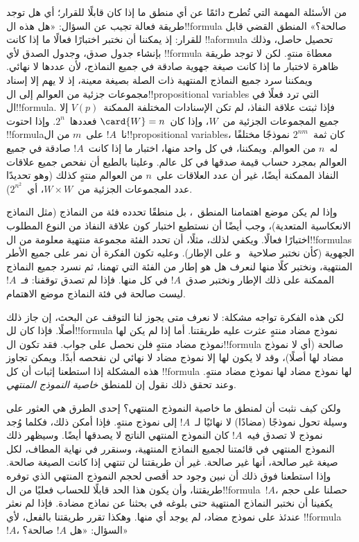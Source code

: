 \documentclass[../../../include/open-logic-section]{subfiles}
\begin{document}


من الأسئلة المهمة التي تُطرح دائمًا عن أي منطق ما إذا كان قابلًا للقرار؛
أي هل توجد طريقة فعالة تجيب عن السؤال: «هل هذه ال!!{formula} صالحة؟»
المنطق القضي قابل للقرار: إذ يمكننا أن نختبر اختبارًا فعالًا ما إذا كانت
!!a{formula} تحصيل حاصل، وذلك بإنشاء جدول صدق، وجدول الصدق لأي
!!{formula} معطاة منتهٍ. لكن لا توجد طريقة ظاهرة لاختبار ما إذا كانت صيغة
جهوية صادقة في جميع النماذج، لأن عددها لا نهائي. ويمكننا سرد جميع النماذج
المنتهية ذات الصلة بصيغة معينة، إذ لا يهم إلا إسناد مجموعات جزئية من العوالم
إلى ال!!{propositional variable}s التي ترد فعلًا في ال!!{formula}. فإذا
ثبتت علاقة النفاذ، لم تكن الإسنادات المختلفة الممكنة~$V(p)$ إلا جميع
المجموعات الجزئية من~$W$، وإذا كان~$\card{W}=n$ فعددها~$2^n$. وإذا
احتوت !!{formula}نا~$!A$ على~$m$ من ال!!{propositional
  variable}s،
كان ثمة~$2^{nm}$ نموذجًا مختلفًا له~$n$ من العوالم. ويمكننا، في كل واحد
منها، اختبار ما إذا كانت~$!A$ صادقة في جميع العوالم بمجرد حساب قيمة صدقها
في كل عالم. وعلينا بالطبع أن نفحص جميع علاقات النفاذ الممكنة أيضًا، غير أن
عدد العلاقات على~$n$ من العوالم منتهٍ كذلك (وهو تحديدًا عدد المجموعات
الجزئية من~$W \times W$، أي~$2^{n^2}$).

وإذا لم يكن موضع اهتمامنا المنطق~، بل منطقًا تحدده فئة من النماذج
(مثل النماذج الانعكاسية المتعدية)، وجب أيضًا أن نستطيع اختبار كون علاقة
النفاذ من النوع المطلوب اختبارًا فعالًا. ويكفي لذلك، مثلًا، أن تحدد الفئة
مجموعة منتهية معلومة من ال!!{formula}s الجهوية (كأن نختبر صلاحية~
و على الإطار).
وعليه تكون الفكرة أن نمر على جميع الأطر المنتهية، ونختبر كلًا منها لنعرف هل
هو إطار من الفئة التي تهمنا، ثم نسرد جميع النماذج الممكنة على ذلك الإطار
ونختبر صدق~$!A$ في كل منها. فإذا لم تصدق توقفنا: فـ~$!A$ ليست صالحة في
فئة النماذج موضع الاهتمام.

لكن هذه الفكرة تواجه مشكلة: لا نعرف متى يجوز لنا التوقف عن البحث، إن جاز
ذلك أصلًا. فإذا كان لل!!{formula} نموذج مضاد منتهٍ عثرت عليه طريقتنا. أما
إذا لم يكن لها نموذج مضاد منتهٍ فلن نحصل على جواب. فقد تكون ال!!{formula}
صالحة (أي لا نموذج مضاد لها أصلًا)، وقد لا يكون لها إلا نموذج مضاد لا نهائي
لن نفحصه أبدًا. ويمكن تجاوز هذه المشكلة إذا استطعنا إثبات أن كل !!{formula}
لها نموذج مضاد لها نموذج مضاد منتهٍ. وعند تحقق ذلك نقول إن للمنطق
\emph{خاصية النموذج المنتهي}.

ولكن كيف نثبت أن لمنطق ما خاصية النموذج المنتهي؟ إحدى الطرق هي العثور على
وسيلة تحول نموذجًا (مضادًا) لا نهائيًا لـ~$!A$ إلى نموذج منتهٍ. فإذا أمكن
ذلك، فكلما وُجد نموذج لا تصدق فيه~$!A$ كان النموذج المنتهي الناتج لا يصدقها
أيضًا. وسيظهر ذلك النموذج المنتهي في قائمتنا لجميع النماذج المنتهية، وسنقرر
في نهاية المطاف، لكل صيغة غير صالحة، أنها غير صالحة. غير أن طريقتنا لن
تنتهي إذا كانت الصيغة صالحة. وإذا استطعنا فوق ذلك أن نبين وجود حد أقصى لحجم
النموذج المنتهي الذي توفره طريقتنا، وأن يكون هذا الحد قابلًا للحساب فعليًا
من ال!!{formula}~$!A$، حصلنا على حجم يكفينا أن نختبر النماذج المنتهية حتى
بلوغه في بحثنا عن نماذج مضادة. فإذا لم نعثر عندئذ على نموذج مضاد، لم يوجد
أي منها. وهكذا تقرر طريقتنا بالفعل، لأي !!{formula}~$!A$، السؤال: «هل
$!A$ صالحة؟»
\end{document}
